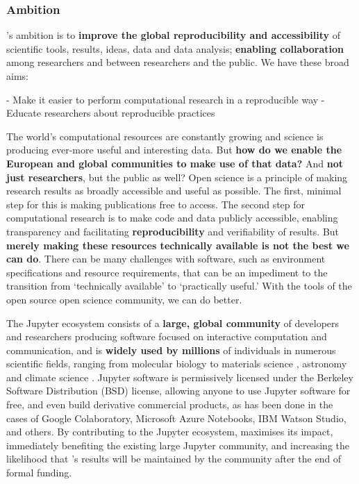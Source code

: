 
\subsubsection{Ambition}

\TheProject's ambition is to \textbf{improve the global reproducibility and accessibility} of scientific
tools, results, ideas, data and data analysis;
\textbf{enabling collaboration} among researchers and between researchers and the public.
We have these broad aims:

- Make it easier to perform computational research in a reproducible way
- Educate researchers about reproducible practices

The world's computational resources are
constantly growing and science is producing ever-more useful and
interesting data.  But \textbf{how do we enable the European and global
communities to make use of that data?}  And \textbf{not just researchers}, but
the public as well?  Open science is a principle of making research
results as broadly accessible and useful as possible.  The first,
minimal step for this is making publications free to access.  The
second step for computational research is to make code and data
publicly accessible, enabling transparency and facilitating
\textbf{reproducibility} and verifiability of results.  But \textbf{merely making these
resources technically available is not the best we can do}.  There can
be many challenges with software, such as environment specifications
and resource requirements, that can be an impediment to the transition
from `technically available' to `practically useful.'  With the tools
of the open source open science community, we can do better.


The Jupyter ecosystem consists of a \textbf{large, global community} of
developers and researchers producing software focused on interactive
computation and communication, and is \textbf{widely used by millions} of
individuals in numerous scientific fields, ranging from molecular
biology \cite{Wang2016} to materials science \cite{Hughes2014},
astronomy \cite{Baron2017} and climate science
\cite{Laken2015,Laken2015b}.  Jupyter software is permissively
licensed under the Berkeley Software Distribution (BSD) license,
allowing anyone to use Jupyter software for free, and even build
derivative commercial products, as has been done in the cases of
Google Colaboratory, Microsoft Azure Notebooks, IBM Watson Studio, and
others.  By contributing to the Jupyter ecosystem,
\TheProject maximises its impact, immediately benefiting the existing
large Jupyter community, and increasing the likelihood that
\TheProject's results will be maintained by the community after the
end of formal funding.

